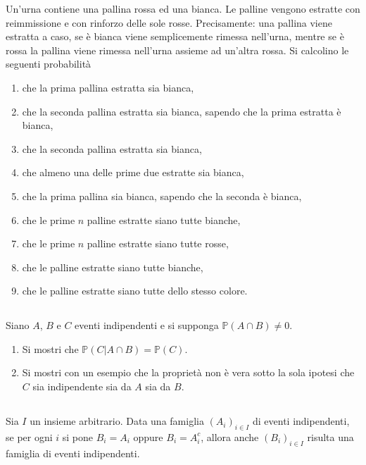 Un'urna contiene una pallina rossa ed una bianca. Le palline vengono estratte con reimmissione e con rinforzo delle sole rosse. Precisamente: una pallina viene estratta a caso, se è bianca viene semplicemente rimessa nell'urna, mentre se è rossa la pallina viene rimessa nell'urna assieme ad un'altra rossa. Si calcolino le seguenti probabilità
\begin{enumerate}
\item che la prima pallina estratta sia bianca,
\item che la seconda pallina estratta sia bianca, sapendo che la prima estratta è bianca,
\item che la seconda pallina estratta sia bianca,
\item che almeno una delle prime due estratte sia bianca,
\item che la prima pallina sia bianca, sapendo che la seconda è bianca,
\item che le prime $n$ palline estratte siano tutte bianche,
\item che le prime $n$ palline estratte siano tutte rosse,
\item che le palline estratte siano tutte bianche,
\item che le palline estratte siano tutte dello stesso colore.
\end{enumerate}
\subsection{}

Siano $A$, $B$ e $C$ eventi indipendenti e si supponga $\mathbb{P}( A\cap B) \neq 0$.
\begin{enumerate}
\item Si mostri che $\mathbb{P}( C|A\cap B) =\mathbb{P}( C)$.
\item Si mostri con un esempio che la proprietà non è vera sotto la sola ipotesi che $C$ sia indipendente sia da $A$ sia da $B$.
\end{enumerate}
\subsection{}

Sia $I$ un insieme arbitrario. Data una famiglia $( A_{i})_{i\in I}$ di eventi indipendenti, se per ogni $i$ si pone $B_{i} =A_{i}$ oppure $B_{i} =A_{i}^{c}$, allora anche $( B_{i})_{i\in I}$ risulta una famiglia di eventi indipendenti.


\ParteSoluzioni


